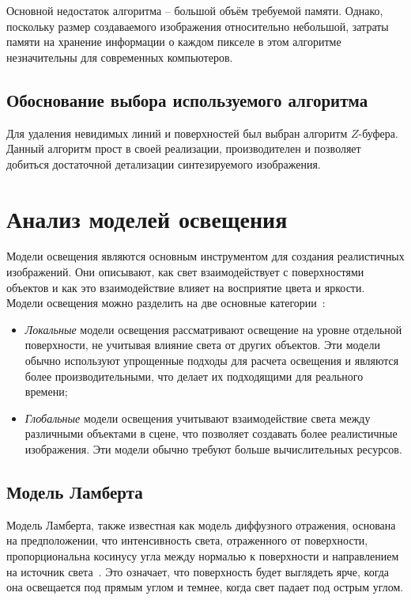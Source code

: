 Основной недостаток алгоритма -- большой объём требуемой памяти. Однако, поскольку размер создаваемого изображения относительно небольшой, затраты памяти на хранение информации о каждом пикселе в этом алгоритме незначительны для современных компьютеров.

\subsection{Обоснование выбора используемого алгоритма}

Для удаления невидимых линий и поверхностей был выбран алгоритм $Z$-буфера. Данный алгоритм прост в своей реализации, производителен и позволяет добиться достаточной детализации синтезируемого изображения.

\section{Анализ моделей освещения}

Модели освещения являются основным инструментом для создания реалистичных изображений. Они описывают, как свет взаимодействует с поверхностями объектов и как это взаимодействие влияет на восприятие цвета и яркости. Модели освещения можно разделить на две основные категории~\cite{lit3}:
\begin{itemize}[label=--]
	\item \textit{Локальные} модели освещения рассматривают освещение на уровне отдельной поверхности, не учитывая влияние света от других объектов. Эти модели обычно используют упрощенные подходы для расчета освещения и являются более производительными, что делает их подходящими для реального времени;
	\item \textit{Глобальные} модели освещения учитывают взаимодействие света между различными объектами в сцене, что позволяет создавать более реалистичные изображения. Эти модели обычно требуют больше вычислительных ресурсов.
\end{itemize}

\subsection{Модель Ламберта}

Модель Ламберта, также известная как модель диффузного отражения, основана на предположении, что интенсивность света, отраженного от поверхности, пропорциональна косинусу угла между нормалью к поверхности и направлением на источник света~\cite{lit3, lit7}. Это означает, что поверхность будет выглядеть ярче, когда она освещается под прямым углом и темнее, когда свет падает под острым углом. 


